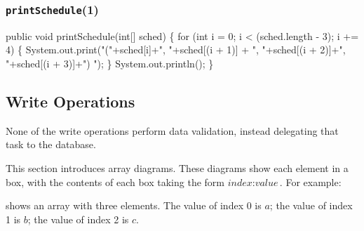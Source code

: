 \documentclass{article}
\def\nwendcode{\endtrivlist \endgroup}
\theoremstyle{definition}
\begin{document}
\nwendcode{}\subsubsection{{\tt{}\protect{}printSchedule}(1)}
\nwenddocs{}\endmoddef{}
public void printSchedule(int[] sched) \{
  for (int i = 0; i < (sched.length - 3); i += 4) \{
    System.out.print("("+sched[i]+", "+sched[(i + 1)]
      + ", "+sched[(i + 2)]+", "+sched[(i + 3)]+") ");
  \}
  System.out.println();
\}
\eatline
{}\nwendcode{}\subsection{Write Operations}
\label{sec:write-operations}
None of the write operations perform data validation, instead
delegating that task to the database.

This section introduces array diagrams. These diagrams show each element
in a box, with the contents of each box taking the form
$\textit{index}:\textit{value}$. For example:

\begin{figure}[h]
\centering
{}
\end{figure}

\noindent shows an array with three elements. The value of index 0 is $a$; the
value of index 1 is $b$; the value of index 2 is $c$.
\end{document}
